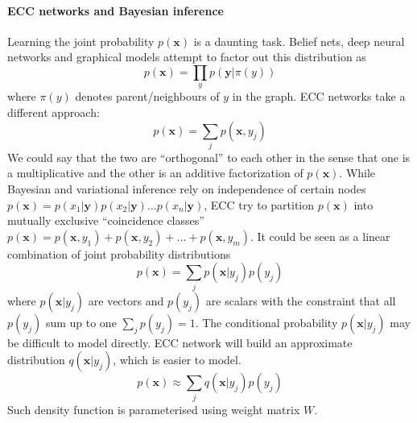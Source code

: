 \documentclass[12pt]{article}
\begin{document}
\paragraph{ECC networks and Bayesian inference}  Learning the joint probability $p(\boldsymbol{x})$ is a daunting task. Belief nets, deep neural networks and graphical models attempt to factor out this distribution as
\[
p(\boldsymbol{x})=\prod_{y} p(\boldsymbol{y}|\pi(y))
\]
where $\pi(y)$ denotes parent/neighbours of $y$ in the graph. ECC networks take a different approach: 
\[
p(\boldsymbol{x})=\sum_{j} p(\boldsymbol{x},y_j)
\]
We could say that the two are ``orthogonal'' to each other in the sense that one is a multiplicative and the other is an additive factorization of $p(\boldsymbol{x})$.  While Bayesian and variational inference rely on independence of certain nodes $p(\boldsymbol{x})=p(x_1|\boldsymbol{y})p(x_2|\boldsymbol{y})...p(x_n|\boldsymbol{y})$, ECC try to partition $p(\boldsymbol{x})$ into mutually exclusive ``coincidence classes''
$p(\boldsymbol{x})=p(\boldsymbol{x},y_1)+p(\boldsymbol{x},y_2)+...+p(\boldsymbol{x},y_m)$. It could be seen as a linear combination of joint probability distributions
\[
p(\boldsymbol{x})=\sum_{j} p(\boldsymbol{x}|y_j) p(y_j)
\]
where $p(\boldsymbol{x}|y_j)$ are vectors and $p(y_j)$ are scalars with the constraint that all  $p(y_j)$ sum up to one $\sum_{j} p(y_j)=1$. The conditional probability $p(\boldsymbol{x}|y_j)$  may be difficult  to model directly. ECC network will build an approximate distribution $q(\boldsymbol{x}|y_j)$, which is easier to model. 
\[
p(\boldsymbol{x})\approx\sum_{j} q(\boldsymbol{x}|y_j) p(y_j)
\]
Such density function is parameterised using weight matrix $W$.
\end{document}
